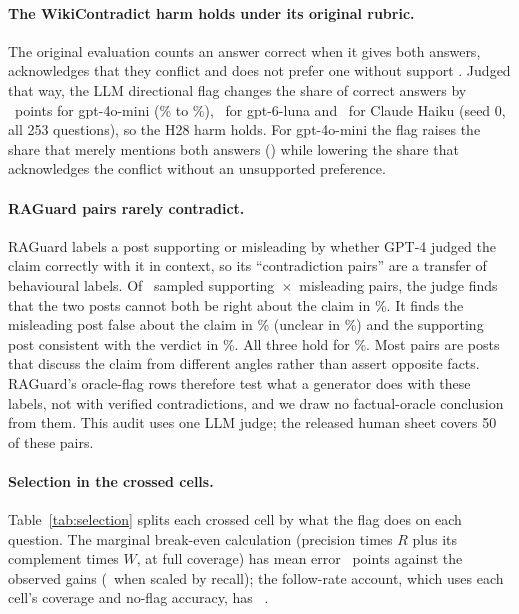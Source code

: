 \paragraph{The WikiContradict harm holds under its original rubric.} The original evaluation counts an answer correct when it gives
both answers, acknowledges that they conflict and does not prefer one without support
\citep[\S3.4]{hou2024wikicontradict}. Judged that way, the LLM directional flag changes the share of correct answers
by \wikiOrigMiniEff\ points for gpt-4o-mini (\wikiOrigMiniPlain\% to \wikiOrigMiniDir\%), \wikiOrigLunaEff\ for
gpt-6-luna and \wikiOrigHaikuEff\ for Claude Haiku (seed 0, all 253 questions), so the H28 harm holds. For gpt-4o-mini the flag raises the share that merely mentions both answers (\wikiBothMiniEff) while
lowering the share that acknowledges the conflict without an unsupported preference.

\paragraph{RAGuard pairs rarely contradict.} RAGuard labels a post supporting or misleading by whether GPT-4 judged the claim correctly
with it in context, so its ``contradiction pairs'' are a transfer of behavioural labels. Of \rgAudN\ sampled
supporting~$\times$~misleading pairs, the judge finds that the two posts cannot both be right about the claim in
\rgAudContradict\%. It finds the misleading post false about the claim in \rgAudBFalse\% (unclear in
\rgAudBUnclear\%) and the supporting post consistent with the verdict in \rgAudASupports\%. All three hold for
\rgAudVerified\%. Most pairs are posts that discuss the claim from different angles rather than assert opposite
facts. RAGuard's oracle-flag rows therefore test what a generator does with these labels, not with verified
contradictions, and we draw no factual-oracle conclusion from them. This audit uses one LLM judge; the released
human sheet covers 50 of these pairs.


\paragraph{Selection in the crossed cells.} Table~\ref{tab:selection} splits each crossed cell by what the flag does
on each question. The marginal break-even calculation (precision times $R$ plus its complement times $W$, at full
coverage) has mean error \selMargMae\ points against the observed gains (\selMargCovMae\ when scaled by recall); the
follow-rate account, which uses each cell's coverage and no-flag accuracy, has \predEightMae\ \predEightMaeCI.
